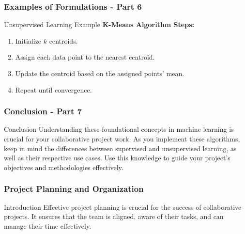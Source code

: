 \documentclass[aspectratio=169]{beamer}
\begin{document}
\begin{frame}[fragile]
    \frametitle{Examples of Formulations - Part 6}
    \begin{block}{Unsupervised Learning Example}
        \textbf{K-Means Algorithm Steps:}
        \begin{enumerate}
            \item Initialize $k$ centroids.
            \item Assign each data point to the nearest centroid.
            \item Update the centroid based on the assigned points' mean.
            \item Repeat until convergence.
        \end{enumerate}
    \end{block}
\end{frame}

\begin{frame}[fragile]
    \frametitle{Conclusion - Part 7}
    \begin{block}{Conclusion}
        Understanding these foundational concepts in machine learning is crucial for your collaborative project work. 
        As you implement these algorithms, keep in mind the differences between supervised and unsupervised learning, 
        as well as their respective use cases. Use this knowledge to guide your project's objectives and methodologies effectively.
    \end{block}
\end{frame}

\begin{frame}[fragile]
    \frametitle{Project Planning and Organization}
    \begin{block}{Introduction}
        Effective project planning is crucial for the success of collaborative projects. It ensures that the team is aligned, aware of their tasks, and can manage their time effectively.
    \end{block}
\end{frame}
\end{document}
